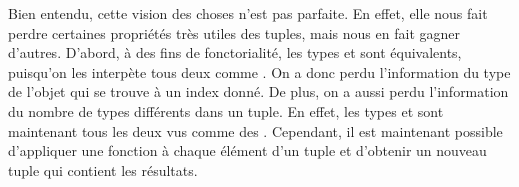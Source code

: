 
Bien entendu, cette vision des choses n'est pas parfaite. En effet, elle
nous fait perdre certaines propriétés très utiles des tuples, mais nous en
fait gagner d'autres. D'abord, à des fins de fonctorialité, les types
 et  sont
équivalents, puisqu'on les interpète tous deux comme
. On a donc perdu l'information du
type de l'objet qui se trouve à un index donné. De plus, on a aussi perdu
l'information du nombre de types différents dans un tuple. En effet, les
types  et  sont maintenant tous les
deux vus comme des . Cependant, il est
maintenant possible d'appliquer une fonction à chaque élément d'un
tuple et d'obtenir un nouveau tuple qui contient les résultats.




\begin{comment}
Ensuite, supposons qu'on veut ordonner deux tuples. Quand est-ce que ça
fait du sens de faire ça? Pour répondre à cette question, on commence
par voir le tuple comme un array de variants. Ensuite, il suffit de faire
une comparaison lexicographique standard sur cet array. Le problème devient
donc de savoir comment on peut comparer deux variants. La nouvelle question
se formule ainsi: Étant donné deux variants<T1, ..., Tn>, quand est-ce
qu'il fait du sens d'ordonner ces variants. Pour nous faciliter la vie,
on commence par réduire le problème en ne considérant que des variants
binaires, c'est-à-dire des variants de la forme variant<T, U>. On ne perd
aucune généralité parce qu'un variant n-aire variant<T1, ..., Tn> est
équivalent à un variant binaire variant<T1, variant<T2, ..., Tn>>.
La question est maintenant beaucoup plus simple: étant donné deux
variants variant<T, U>, quand est-ce qu'il fait du sens de les comparer?
Il se trouve que j'ai déjà la réponse dans Hana avec les cross-type
operations!
    >> Ok, pas certain qu'on veuille orderer les tuples comme des arrays de
    >> variants. C'est peut-être mieux de juste les regarder comme des tuples
    >> normaux.


Ensuite, on peut faire le pont avec Hana en disant simplement que Hana
considère qu'une fonction sur un variant connu au moment de la compilation
n'est rien d'autre qu'une fonction overloadée, et que hana::_tuple est un
array de variants qui est super optimisé pour les cas où on connaît
ce qui est contenu dans chaque variant de l'array au moment de la
compilation.
\end{comment}



